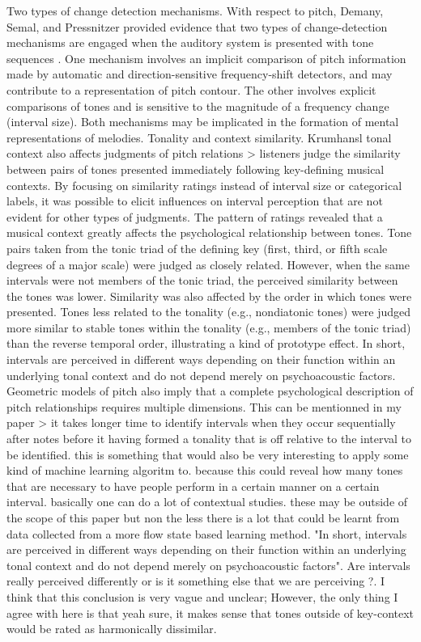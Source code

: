 Two types of change detection mechanisms. With respect to pitch, Demany, Semal, and Pressnitzer provided evidence that two types of change-detection mechanisms are engaged when the auditory system is presented with tone sequences \cite{demany2011implicit}. One mechanism involves an implicit comparison of pitch information made by automatic and direction-sensitive frequency-shift detectors, and may contribute to a representation of pitch contour. The other involves explicit comparisons of tones and is sensitive to the magnitude of a frequency change (interval size). Both mechanisms may be implicated in the formation of mental representations of melodies.
Tonality and context similarity. Krumhansl tonal context also affects judgments of pitch relations \cite{krumhansl1979psychological} > listeners judge the similarity between pairs of tones presented immediately following key-defining musical contexts. By focusing on similarity ratings instead of interval size or categorical labels, it was possible to elicit influences on interval perception that are not evident for other types of judgments. The pattern of ratings revealed that a musical context greatly affects the psychological relationship between tones. Tone pairs taken from the tonic triad of the defining key (first, third, or fifth scale degrees of a major scale) were judged as closely related. However, when the same intervals were not members of the tonic triad, the perceived similarity between the tones was lower. Similarity was also affected by the order in which tones were presented. Tones less related to the tonality (e.g., nondiatonic tones) were judged more similar to stable tones within the tonality (e.g., members of the tonic triad) than the reverse temporal order, illustrating a kind of prototype effect. In short, intervals are perceived in different ways depending on their function within an underlying tonal context and do not depend merely on psychoacoustic factors. Geometric models of pitch also imply that a complete psychological description of pitch relationships requires multiple dimensions. This can be mentionned in my paper > it takes longer time to identify intervals when they occur sequentially after notes before it having formed a tonality that is off relative to the interval to be identified. this is something that would also be very interesting to apply some kind of machine learning algoritm to. because this could reveal how many tones that are necessary to have people perform in a certain manner on a certain interval. basically one can do a lot of contextual studies. these may be outside of the scope of this paper but non the less there is a lot that could be learnt from data collected from a more flow state based learning method. "In short, intervals are perceived in different ways depending on their function within an underlying tonal context and do not depend merely on psychoacoustic factors". Are intervals really perceived differently or is it something else that we are perceiving ?. I think that this conclusion is very vague and unclear; However, the only thing I agree with here is that yeah sure, it makes sense that tones outside of key-context would be rated as harmonically dissimilar.
